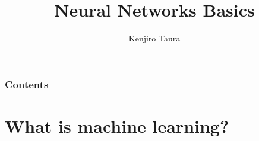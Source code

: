 \documentclass[12pt,dvipdfmx]{beamer}
\title{Neural Networks Basics}
\institute{}
\author{Kenjiro Taura}
\date{}
\begin{document}
\maketitle

\begin{frame}
\frametitle{Contents}
\tableofcontents
\end{frame}

\newcommand{\Convolution}{\mbox{Convolution}}
\newcommand{\Linear}{\mbox{Linear}}
\newcommand{\relu}{\mbox{relu}}
\newcommand{\ReLU}{\mbox{ReLU}}
\newcommand{\maxpool}{\mbox{maxpool}}
\newcommand{\relutwo}{\mbox{relu2}}
\newcommand{\ReLUtwo}{\mbox{ReLU2}}
\newcommand{\softmax}{\mbox{softmax}}
\newcommand{\logsoftmax}{\mbox{logsoftmax}}
\newcommand{\nll}{\mbox{NLL}}
\newcommand{\crossentropy}{\mbox{cross\_entropy}}
\newcommand{\pp}[2]{\frac{\partial #1}{\partial #2}}
\newcommand{\ppt}[2]{\frac{{}^t\partial #1}{\partial #2}}
\newcommand{\vecthree}[3]{\left(\begin{array}{c} #1 \\ #2 \\ #3 \end{array}\right)}
\newcommand{\mathree}[9]{\left(\begin{array}{ccc} #1 & #2 & #3 \\ #4 & #5 & #6 \\ #7 & #8 & #9 \end{array}\right)}
\newcommand{\sign}{\mbox{sign}}
\newcommand{\diag}{\mbox{diag}}

\section{What is machine learning?}
\end{document}
